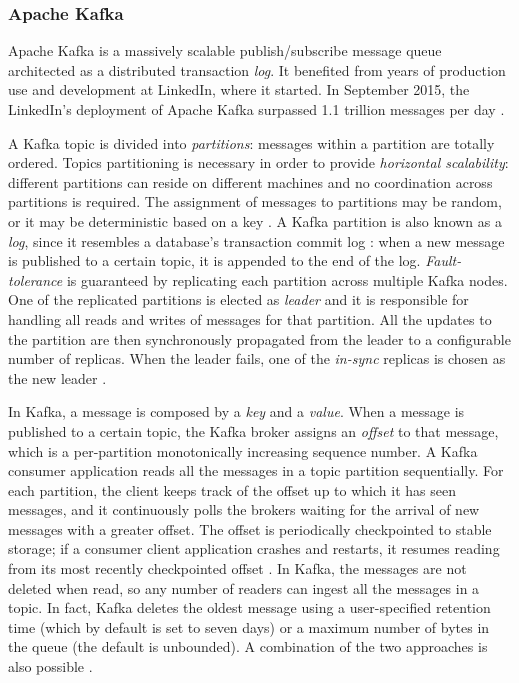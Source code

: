 \subsubsection{Apache Kafka}
Apache Kafka is a massively scalable publish/subscribe message queue architected as a distributed transaction \emph{log}. It benefited from years of production use and development at LinkedIn, where it started. In September 2015, the LinkedIn’s deployment of Apache Kafka surpassed 1.1 trillion messages per day \cite{fastdataarchitecture}.  

A Kafka topic is divided into \emph{partitions}: messages within a partition are totally ordered. Topics partitioning is necessary in order to provide \emph{horizontal scalability}: different partitions can reside on different machines and no coordination across partitions is required. The assignment of messages to partitions may be random, or it may be deterministic based on a key \cite{philosophydistributeddata}. A Kafka partition is also known as a \emph{log}, since it resembles a database’s transaction commit log \cite{philosophydistributeddata}: when a new message is published to a certain topic, it is appended to the end of the log. \emph{Fault-tolerance} is guaranteed by replicating each partition across multiple Kafka nodes. One of the replicated partitions is elected as \emph{leader} and it is responsible for handling all reads and writes of messages for that partition. All the updates to the partition are then synchronously propagated from the leader to a configurable number of replicas. When the leader fails, one of the \emph{in-sync} replicas is chosen as the new leader \cite{philosophydistributeddata}. 

In Kafka, a message is composed by a \emph{key} and a \emph{value}. When a message is published to a certain topic, the Kafka broker assigns an \emph{offset} to that message, which is a per-partition monotonically increasing sequence number. A Kafka consumer application reads all the messages in a topic partition sequentially. For each partition, the client keeps track of the offset up to which it has seen messages, and it continuously polls the brokers waiting for the arrival of new messages with a greater offset. The offset is periodically checkpointed to stable storage; if a consumer client application crashes and restarts, it resumes reading from its most recently checkpointed offset \cite{philosophydistributeddata}. In Kafka, the messages are not deleted when read, so any number of readers can ingest all the messages in a topic. In fact, Kafka deletes the oldest message using a user-specified retention time (which by default is set to seven days) or a maximum number of bytes in the queue (the default is unbounded). A combination of the two approaches is also possible \cite{fastdataarchitecture}.

